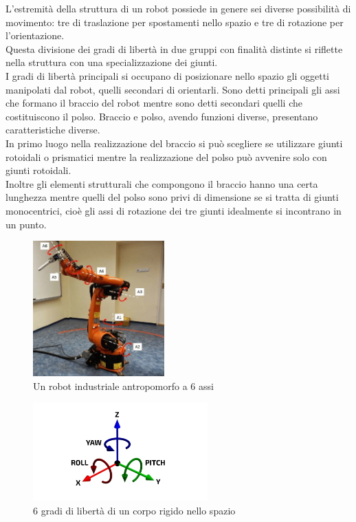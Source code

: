 \documentclass[%
corpo=11pt,
twoside,
 stile=classica,
oldstyle,
greek,%
]{toptesi}
\begin{document}
	 L'estremità della struttura di un robot possiede in genere sei diverse possibilità di movimento: tre di traslazione per spostamenti nello spazio e tre di rotazione per l'orientazione.\\
	 Questa divisione dei gradi di libertà in due gruppi con finalità distinte si riflette nella struttura con una specializzazione dei giunti. \\
	 I gradi di libertà principali si occupano di posizionare nello spazio gli oggetti manipolati dal robot, quelli secondari di orientarli. Sono detti principali gli assi che formano il braccio del robot mentre sono detti secondari quelli che costituiscono il polso. Braccio e polso, avendo funzioni diverse, presentano caratteristiche diverse. \\
	 In primo luogo nella realizzazione del braccio si può scegliere se utilizzare giunti rotoidali o prismatici mentre la realizzazione del polso può avvenire solo con giunti rotoidali. \\
	 Inoltre gli elementi strutturali che compongono il braccio hanno una certa lunghezza mentre quelli del polso sono privi di dimensione se si tratta di giunti monocentrici, cioè gli assi di rotazione dei tre giunti idealmente si incontrano in un punto. \\
	 \begin{figure} [H]
	 	\centering
	 	\includegraphics[width=0.45\textwidth]{pictures/KUKA.png}
	 	\caption{Un robot industriale antropomorfo a 6 assi}
	 	\label{fig:KUKA}
	 \end{figure}
	 \begin{figure} [H]
	 	\centering
	 	\includegraphics[width=0.6\textwidth]{pictures/6DOF.png}
	 	\caption{6 gradi di libertà di un corpo rigido nello spazio}
	 	\label{fig:6DOF}
	 \end{figure}
\end{document}
